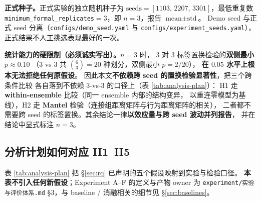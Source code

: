\textbf{正式种子。}正式实验的独立随机种子为
$\text{seeds}=[1103,\,2207,\,3301]$，最低重复数
\texttt{minimum\_formal\_replicates}$=3$，即 $n=3$，报告 $\text{mean}\pm\text{std}$。
Demo seed 与正式 seed 分离（\texttt{configs/demo\_seed.yaml} 与
\texttt{configs/experiment\_seeds.yaml}），正式结果不人工挑选表现最好的一次。

\textbf{统计能力的硬限制（必须诚实写出）。}$n=3$ 时，
3 对 3 标签置换检验的\textbf{双侧最小 $p\approx0.10$}
（$3$ vs $3$ 共 $\binom{6}{3}=20$ 种划分，双侧最小 $p=2/20$），
\textbf{在 $0.05$ 水平上根本无法拒绝任何原假设}。
因此本文\textbf{不依赖跨 seed 的置换检验显著性}，把三个跨条件比较
各自落到不依赖 $3$-vs-$3$ 的口径上（表 \ref{tab:analysis-plan}）：
H1 走 \textbf{within-ensemble} 比较（同一 ensemble 内部的结构变异，
以重连零模型为基线），H2 走 \textbf{Mantel} 检验（连接组距离矩阵与行为距离矩阵的相关），
二者都不需要跨 seed 的标签置换。其余结论一律\textbf{以效应量与跨 seed 波动并列报告}，
并在结论中显式标注 $n=3$。

\subsection{分析计划如何对应 H1--H5}\label{sec:exp-matrix}

表 \ref{tab:analysis-plan} 把 \S\ref{sec:rq} 已声明的五个假设映射到实验与检验口径。
\textbf{本表不引入任何新假设}；Experiment A--F 的定义与产物 owner 为
\texttt{experiment/实验与评价体系.md} \S3，与 baseline / 消融相关的细节见
\S\ref{sec:baselines}。

\begin{table}[H]
  \centering
  \caption{假设、实验、检验口径。第三列的措辞与 \S\ref{sec:rq} 一致。}
  \label{tab:analysis-plan}
  \footnotesize
\setlength{\tabcolsep}{3pt}
\end{table}

